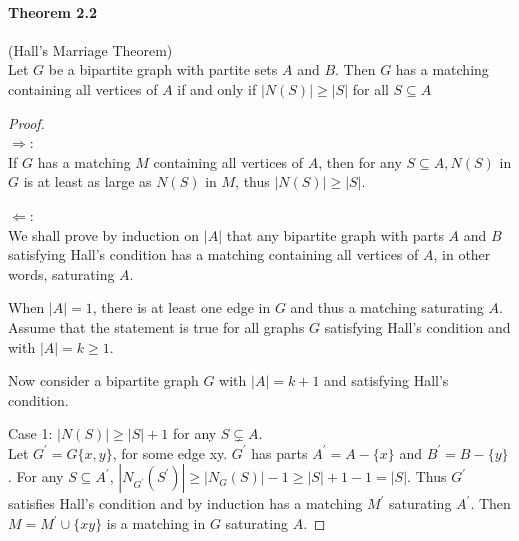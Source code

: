 \paragraph{Theorem 2.2} (Hall's Marriage Theorem) \\
Let $ G $ be a bipartite graph with partite sets $ A $ and $ B$. Then $ G $ has 
a matching containing all vertices of $ A $ if and only if 
$ |N(S)| \geq |S| $ for all $ S \subseteq A$
\begin{proof} $ $ \\
   $\Rightarrow$: \\
   If $ G $ has a matching $ M $ containing all vertices of $ A $, then for any 
   $ S \subseteq A, N(S) $ in $ G $ is at least as large as $ N(S) $ in $ M $, 
   thus $ |N(S)| \geq |S| $.

   \smallskip \noindent
   $\Leftarrow$: \\
   We shall prove by induction on $ |A| $ that any bipartite graph with parts
   $ A $ and $ B $ satisfying Hall's condition has a matching containing all 
   vertices of $ A $, in other words, saturating $ A$.

   \bigskip \noindent
   When $ |A| = 1 $, there is at least one edge in $ G $ and thus a matching 
   saturating $ A $. \\
   Assume that the statement is true for all graphs $ G $ satisfying Hall's
   condition and with $ |A| = k \geq 1 $. 
   
   \smallskip \noindent
   Now consider a bipartite graph $ G $ with $ |A| = k + 1 $ and satisfying 
   Hall's condition.

   \bigskip \noindent
   Case 1: $|N(S)| \geq |S| + 1 $ for any $ S \subsetneq A $. \\
   Let $ G^\prime = G \{x,y\} $, for some edge xy. $ G^\prime $ has 
   parts $ A^\prime = A - \{x\} $ and $ B^\prime = B - \{y\} $.
   For any $ S \subseteq A^\prime $, $ |N_{G^\prime}(S^\prime)| \geq 
   |N_G(S)| - 1 \geq |S| + 1 - 1 = |S| $. Thus $ G^\prime $ satisfies 
   Hall's condition and by induction has a matching $ M^\prime $ saturating
   $ A^\prime $. Then $ M = M^\prime \cup \{xy\} $ is a matching in 
   $ G $ saturating $ A $.


\end{proof}
